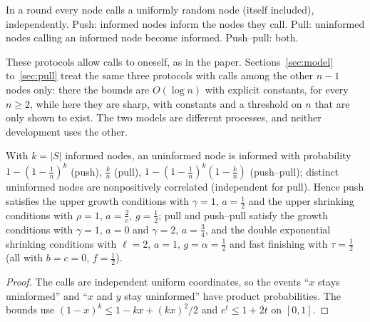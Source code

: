 \begin{definition}\label{def:rumor-protocols}
\leanok{}
In a round every node calls a uniformly random node (itself included), independently. Push:
informed nodes inform the nodes they call. Pull: uninformed nodes calling an informed node become
informed. Push--pull: both.
\end{definition}

These protocols allow calls to oneself, as in the paper. Sections~\ref{sec:model}
to~\ref{sec:pull} treat the same three protocols with calls among the other $n-1$ nodes only:
there the bounds are $O(\log n)$ with explicit constants, for every $n\ge2$, while here they are
sharp, with constants and a threshold on $n$ that are only shown to exist. The two models are
different processes, and neither development uses the other.

\begin{lemma}\label{lem:rumor-protocol-conditions}
\leanok{}
With $k=|S|$ informed nodes, an uninformed node is informed with probability
$1-(1-\frac1n)^k$ (push), $\frac kn$ (pull), $1-(1-\frac1n)^k(1-\frac kn)$ (push--pull);
distinct uninformed nodes are nonpositively correlated (independent for pull). Hence push
satisfies the upper growth conditions with $\gamma=1$, $a=\frac12$ and the upper shrinking
conditions with $\rho=1$, $a=\frac2e$, $g=\frac12$; pull and push--pull satisfy the growth
conditions with $\gamma=1$, $a=0$ and $\gamma=2$, $a=\frac34$, and the double exponential
shrinking conditions with $\ell=2$, $a=1$, $g=\alpha=\frac12$ and fast finishing with
$\tau=\frac12$ (all with $b=c=0$, $f=\frac12$).
\end{lemma}
\begin{proof}\leanok
The calls are independent uniform coordinates, so the events ``$x$ stays uninformed'' and
``$x$ and $y$ stay uninformed'' have product probabilities. The bounds use
$(1-x)^k\le1-kx+(kx)^2/2$ and $e^t\le1+2t$ on $[0,1]$.
\end{proof}

